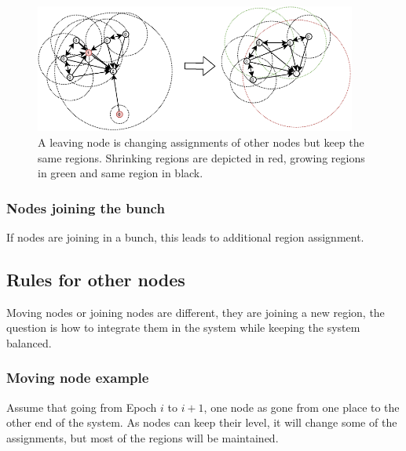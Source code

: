\documentclass[a4paper,11pt,oneside]{report}
\begin{document}
\begin{figure}[!h] 
\centering
\includegraphics[width=300pt]{figures/LocarnoTreaties-Leaving-cluster}
\caption{A leaving node is changing assignments of other
    nodes but keep the same regions. Shrinking regions are depicted in red,
    growing regions in green and same region in black. }
\label{fig:LocarnoTreaties-Leaving-cluster}
\end{figure}

\subsubsection{Nodes joining the bunch} 
If nodes are joining in a bunch, this leads to additional region assignment. 

\subsection{Rules for other nodes}
Moving nodes or joining nodes are different, they are joining a new region, the
question is how to integrate them in the system while keeping the system
balanced. 

\subsubsection{Moving node example}
Assume that going from Epoch $i$ to $i+1$, one node as gone from one place to
the other end of the system. As nodes can keep their level, it will change some
of the assignments, but most of the regions will be maintained. 
\end{document}
